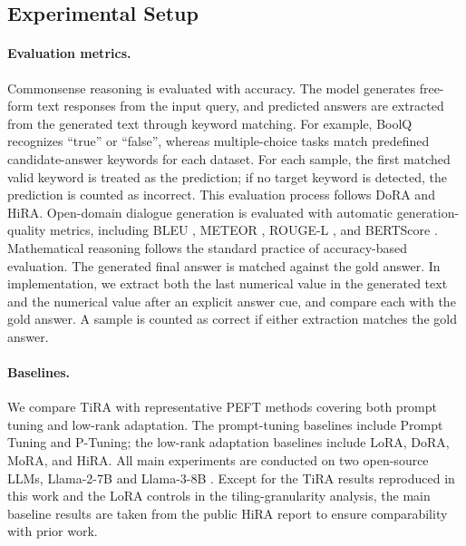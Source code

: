 \documentclass[a4paper,11pt]{article}
\begin{document}
\subsection{Experimental Setup}

\paragraph{Evaluation metrics.}
Commonsense reasoning is evaluated with accuracy. The model generates free-form text responses from the input query, and predicted answers are extracted from the generated text through keyword matching. For example, BoolQ recognizes ``true'' or ``false'', whereas multiple-choice tasks match predefined candidate-answer keywords for each dataset. For each sample, the first matched valid keyword is treated as the prediction; if no target keyword is detected, the prediction is counted as incorrect. This evaluation process follows DoRA and HiRA. Open-domain dialogue generation is evaluated with automatic generation-quality metrics, including BLEU \cite{papineni2002bleu}, METEOR \cite{banerjee2005meteor}, ROUGE-L \cite{lin2004rouge}, and BERTScore \cite{zhang2019bertscore}. Mathematical reasoning follows the standard practice of accuracy-based evaluation. The generated final answer is matched against the gold answer. In implementation, we extract both the last numerical value in the generated text and the numerical value after an explicit answer cue, and compare each with the gold answer. A sample is counted as correct if either extraction matches the gold answer.

\paragraph{Baselines.}
We compare TiRA with representative PEFT methods covering both prompt tuning and low-rank adaptation. The prompt-tuning baselines include Prompt Tuning and P-Tuning; the low-rank adaptation baselines include LoRA, DoRA, MoRA, and HiRA. All main experiments are conducted on two open-source LLMs, Llama-2-7B \cite{touvron2023llama2} and Llama-3-8B \cite{grattafiori2024llama3}. Except for the TiRA results reproduced in this work and the LoRA controls in the tiling-granularity analysis, the main baseline results are taken from the public HiRA report to ensure comparability with prior work.
\end{document}
